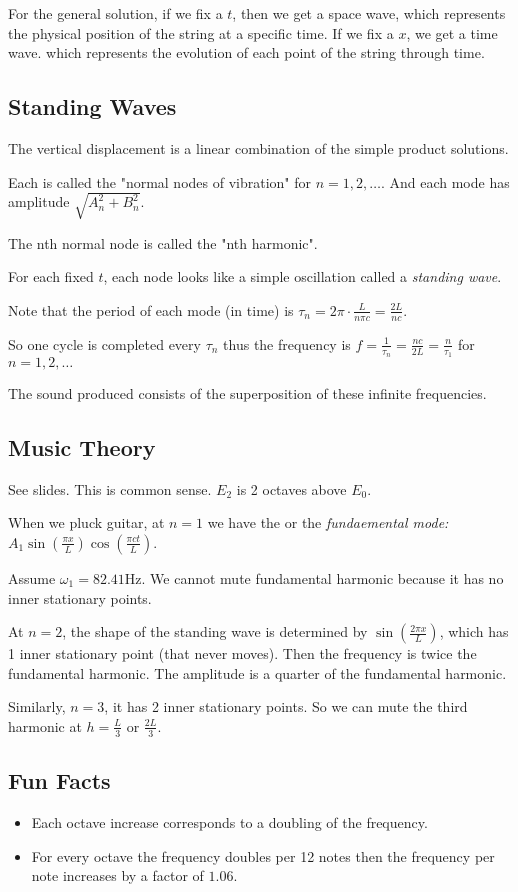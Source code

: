 \documentclass[class=article,crop=false]{standalone}
\begin{document}
\begin{eg}
	For the general solution, if we fix a $ t$, then we get a space wave, which represents the physical position of the string at a specific time. If we fix a  $ x$, we get a time wave. which represents the evolution of each point of the string through time. 
\end{eg}

\subsection{Standing Waves}

The vertical displacement is a linear combination of the simple product solutions.

Each is called the "normal nodes of vibration" for $ n=1,2,\ldots$. And each mode has amplitude $ \sqrt{A_n^2+ B_n^2} $.

The nth normal node is called the "nth harmonic".

For each fixed $ t$, each node looks like a simple oscillation called a  \emph{standing wave}.

Note that the period of each mode (in time) is $ \tau_n = 2\pi \cdot  \frac{L}{n \pi c} = \frac{2L}{ nc}$.

So one cycle is completed every $ \tau_n$ thus the frequency is $ f= \frac{1}{\tau_n} = \frac{nc}{2L } = \frac{n}{\tau_1}$ for $ n=1,2,\ldots$

The sound produced consists of the superposition of these infinite frequencies.

\subsection{Music Theory}
See slides. This is common sense. $ E_2 $ is 2 octaves above $ E_0$. 

When we pluck guitar, at $ n=1$ we have the   or the \emph{fundaemental mode:} $ A_1 \sin \left( \frac{ \pi x}{ L} \right) \cos \left( \frac{ \pi c t}{ L} \right)  $.

Assume $ \omega_1  = 82.41 $Hz. We cannot mute fundamental harmonic because it has no inner stationary points. 

At $ n=2$, the shape of the standing wave is determined by  $ \sin \left( \frac{ 2\pi x}{ L} \right) $, which has 1 inner stationary point (that never moves). Then the frequency is twice the fundamental harmonic. The amplitude is a quarter of the fundamental harmonic.

Similarly, $ n=3$, it has 2 inner stationary points. So we can mute the third harmonic at $ h=\frac{L}{3}$ or $ \frac{2L}{3}$.

\subsection{Fun Facts}
\begin{itemize}
	\item Each octave increase corresponds to a doubling of the frequency.
	\item For every octave the frequency doubles per 12 notes then the frequency per note increases by a factor of $ 1.06$.
\end{itemize}
\end{document}
